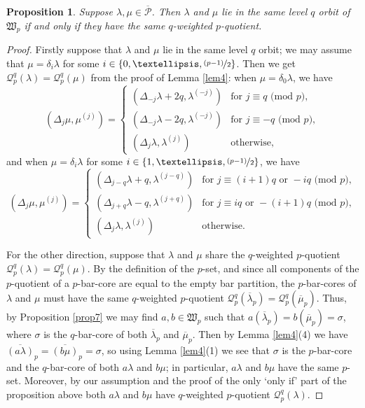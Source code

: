 \documentclass[10pt]{amsart}
\newtheorem{prop}{Proposition}[section]
\begin{document}
\begin{prop}\label{prop8} 
Suppose $\lambda,\mu\in\overline{\mathcal{P}}$. Then $\lambda$ and $\mu$ lie in the same level $q$ orbit of $\mathfrak{W}_p$ if and only if they have the same $q$-weighted $p$-quotient. 
\end{prop}
\begin{proof}
Firstly suppose that $\lambda$ and $\mu$ lie in the same level $q$ orbit; we may assume that $\mu=\delta_i\lambda$ for some $i\in\{0,\dots,\nicefrac{(p-1)}{2}\}$. Then we get $\mathcal{Q}^q_p(\lambda)=\mathcal{Q}^q_p(\mu)$ from the proof of Lemma \ref{lem4}: when $\mu=\delta_0\lambda$, we have 
$$(\Delta_j\mu,\mu^{(j)})=\begin{cases}(\Delta_{-j}\lambda+2q,\lambda^{(-j)})&\text{for }j\equiv q\text{ (mod }p),\\
(\Delta_{-j}\lambda-2q,\lambda^{(-j)})&\text{for }j\equiv-q\text{ (mod }p),\\
(\Delta_j\lambda,\lambda^{(j)})&\text{otherwise},\end{cases}$$ 
and when $\mu=\delta_i\lambda$ for some $i\in\{1,\dots,\nicefrac{(p-1)}{2}\}$, we have 
$$(\Delta_j\mu,\mu^{(j)})=\begin{cases}(\Delta_{j-q}\lambda+q,\lambda^{(j-q)})&\text{for }j\equiv(i+1)q\text{ or }-iq\text{ (mod }p),\\
(\Delta_{j+q}\lambda-q,\lambda^{(j+q)})&\text{for }j\equiv iq\text{ or }-(i+1)q\text{ (mod }p),\\
(\Delta_j\lambda,\lambda^{(j)})&\text{otherwise}.\end{cases}$$ 

For the other direction, suppose that $\lambda$ and $\mu$ share the $q$-weighted $p$-quotient $\mathcal{Q}^q_p(\lambda)=\mathcal{Q}^q_p(\mu)$. By the definition of the $p$-set, and since all components of the $p$-quotient of a $p$-bar-core are equal to the empty bar partition, the $p$-bar-cores of $\lambda$ and $\mu$ must have the same $q$-weighted $p$-quotient $\mathcal{Q}^q_p(\overline{\lambda}_p)=\mathcal{Q}^q_p(\overline{\mu}_p)$. Thus, by Proposition \ref{prop7} we may find $a,b\in\mathfrak{W}_p$ such that $a(\overline{\lambda}_p)=b(\overline{\mu}_p)=\sigma$, where $\sigma$ is the $q$-bar-core of both $\overline{\lambda}_p$ and $\overline{\mu}_p$. Then by Lemma \ref{lem4}(4) we have $\overline{(a\lambda)}_p=\overline{(b\mu)}_p=\sigma$, so using Lemma \ref{lem4}(1) we see that $\sigma$ is the $p$-bar-core and the $q$-bar-core of both $a\lambda$ and $b\mu$; in particular, $a\lambda$ and $b\mu$ have the same $p$-set. Moreover, by our assumption and the proof of the only `only if' part of the proposition above both $a\lambda$ and $b\mu$ have $q$-weighted $p$-quotient $\mathcal{Q}^q_p(\lambda)$. 


\end{proof}
\end{document}
